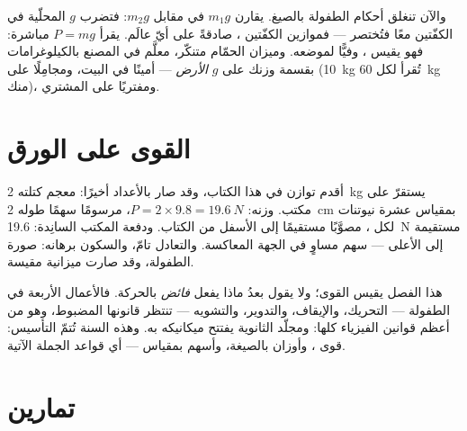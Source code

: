 \begin{remark}\label{rem:g9:weight-vs-mass:scales}
والآن تنغلق أحكام الطفولة بالصيغ.  يقارن
$m_1 g$ في مقابل $m_2 g$: فتضرب $g$ المحلّية في الكفّتين معًا
فتُختصر --- فموازين الكفّتين  \emph{}، صادقةً على
أيّ عالَم.  يقرأ $P = m g$ مباشرة: فهو يقيس
\emph{}، وفيًّا لموضعه. وميزان الحمّام  متنكّر،
معلَّم في المصنع بالكيلوغرامات بقسمة وزنك على $g$
\emph{الأرض} --- أمينًا في البيت، ومجامِلًا على 
(\qty{10}{kg} تُقرأ لكل \qty{60}{kg} منك)، ومفتريًا على
المشتري.
\end{remark}

\section{القوى على الورق}

\begin{example}\label{ex:g9:weight-vs-mass:book}
أقدم توازن في هذا الكتاب، وقد صار بالأعداد أخيرًا: معجم كتلته
\qty{2}{kg} يستقرّ على مكتب. وزنه: $P = 2 \times 9.8 =
\qty{19.6}{N}$، مرسومًا سهمًا طوله \qty{2}{cm} بمقياس عشرة
نيوتنات لكل ، مصوَّبًا مستقيمًا إلى الأسفل من الكتاب.
ودفعة المكتب السانِدة: \qty{19.6}{N} مستقيمة إلى الأعلى ---
سهم مساوٍ في الجهة المعاكسة. والتعادل تامّ، والسكون برهانه:
صورة الطفولة، وقد صارت ميزانية مقيسة.
\end{example}

\begin{remark}\label{rem:g9:weight-vs-mass:dynamics}
هذا الفصل يقيس القوى؛ ولا يقول بعدُ ماذا يفعل \emph{فائض}
 بالحركة. فالأعمال الأربعة في الطفولة --- التحريك،
والإيقاف، والتدوير، والتشويه --- تنتظر قانونها المضبوط، وهو من
أعظم قوانين الفيزياء كلها: ومجلّد الثانوية يفتتح ميكانيكه به.
وهذه السنة تُتمّ التأسيس: قوى ، وأوزان بالصيغة، وأسهم
بمقياس --- أي قواعد الجملة الآتية.
\end{remark}

\section{تمارين}


